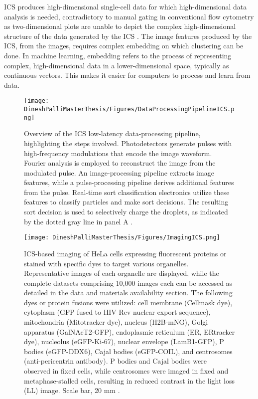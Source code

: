 \documentclass[12pt,a4paper]{article}
\begin{document}
ICS produces high-dimensional single-cell data for which high-dimensional data analysis is needed, contradictory to manual gating in conventional flow cytometry as two-dimensional plots are unable to depict the complex high-dimensional structure of the data generated by the ICS \cite{doi:10.1126/science.abj3013}. The image features produced by the ICS, from the images, requires complex embedding on which clustering can be done. In machine learning, embedding refers to the process of representing complex, high-dimensional data in a lower-dimensional space, typically as continuous vectors. This makes it easier for computers to process and learn from data.

\begin{figure}
  \centering
  \texttt{[image: DineshPalliMasterThesis/Figures/DataProcessingPipelineICS.png]}
  \caption[ICS data processing pipeline illustrated]{Overview of the ICS low-latency data-processing pipeline, highlighting the steps involved. Photodetectors generate pulses with high-frequency modulations that encode the image waveform. Fourier analysis is employed to reconstruct the image from the modulated pulse. An image-processing pipeline extracts image features, while a pulse-processing pipeline derives additional features from the pulse. Real-time sort classification electronics utilize these features to classify particles and make sort decisions. The resulting sort decision is used to selectively charge the droplets, as indicated by the dotted gray line in panel A \cite{doi:10.1126/science.abj3013}.}
  \label{icsdataprocessing}
\end{figure}


\begin{figure}
  \centering
  \texttt{[image: DineshPalliMasterThesis/Figures/ImagingICS.png]}
  \caption[ICS-based imaging of HeLa cells]{ICS-based imaging of HeLa cells expressing fluorescent proteins or stained with specific dyes to target various organelles. Representative images of each organelle are displayed, while the complete datasets comprising 10,000 images each can be accessed as detailed in the data and materials availability section. The following dyes or protein fusions were utilized: cell membrane (Cellmask dye), cytoplasm (GFP fused to HIV Rev nuclear export sequence), mitochondria (Mitotracker dye), nucleus (H2B-mNG), Golgi apparatus (GalNAcT2-GFP), endoplasmic reticulum (ER, ERtracker dye), nucleolus (eGFP-Ki-67), nuclear envelope (LamB1-GFP), P bodies (eGFP-DDX6), Cajal bodies (eGFP-COIL), and centrosomes (anti-pericentrin antibody). P bodies and Cajal bodies were observed in fixed cells, while centrosomes were imaged in fixed and metaphase-stalled cells, resulting in reduced contrast in the light loss (LL) image. Scale bar, 20 mm \cite{doi:10.1126/science.abj3013}.}
  \label{icsimaging}
\end{figure}
\end{document}
